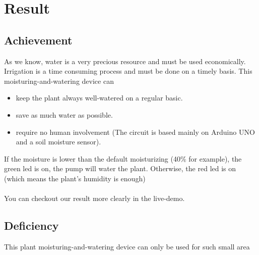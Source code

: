 \documentclass[12pt]{article}
\begin{document}
    \section{Result}
        \subsection{Achievement}
            As we know, water is a very precious resource and must be used economically. Irrigation is a time consuming process and must be done on a timely basis. This moisturing-and-watering device can
            \begin{itemize}
                \item keep the plant always well-watered on a regular basic.
                \item save as much water as possible.
                \item require no human involvement (The circuit is based mainly on Arduino UNO and a soil moisture sensor).
            \end{itemize}     
         If the moisture is lower than the default moisturizing (40\% for example), the green led is on, the pump will water the plant. Otherwise, the red led is on (which means the plant's humidity is enough) \\  \\  
         You can checkout our result more clearly in the live-demo.
        \subsection{Deficiency}
            This plant moisturing-and-watering device can only be used for such small area
\end{document}
